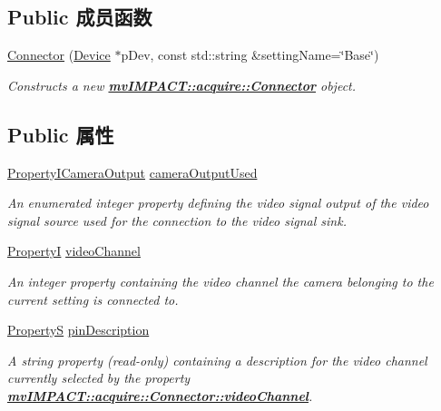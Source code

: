 \subsection*{Public 成员函数}
\begin{DoxyCompactItemize}
\item 
\hyperlink{classmv_i_m_p_a_c_t_1_1acquire_1_1_connector_ae857d0fefd53cf48038b011819e4fb9d}{Connector} (\hyperlink{classmv_i_m_p_a_c_t_1_1acquire_1_1_device}{Device} $\ast$p\+Dev, const std\+::string \&setting\+Name=\char`\"{}Base\char`\"{})
\begin{DoxyCompactList}\small\item\em Constructs a new {\bfseries \hyperlink{classmv_i_m_p_a_c_t_1_1acquire_1_1_connector}{mv\+I\+M\+P\+A\+C\+T\+::acquire\+::\+Connector}} object. \end{DoxyCompactList}\end{DoxyCompactItemize}
\subsection*{Public 属性}
\begin{DoxyCompactItemize}
\item 
\hyperlink{group___common_interface_ga48585b26ebc31ccee54f34c7d6bbdda3}{Property\+I\+Camera\+Output} \hyperlink{classmv_i_m_p_a_c_t_1_1acquire_1_1_connector_aa9f92bb9609d1bfc1d0edd4c23cf7d2d}{camera\+Output\+Used}
\begin{DoxyCompactList}\small\item\em An enumerated integer property defining the video signal output of the video signal source used for the connection to the video signal sink. \end{DoxyCompactList}\item 
\hyperlink{group___common_interface_ga12d5e434238ca242a1ba4c6c3ea45780}{Property\+I} \hyperlink{classmv_i_m_p_a_c_t_1_1acquire_1_1_connector_a22c033da953a263629c4dcf410cfab30}{video\+Channel}
\begin{DoxyCompactList}\small\item\em An integer property containing the video channel the camera belonging to the current setting is connected to. \end{DoxyCompactList}\item 
\hyperlink{classmv_i_m_p_a_c_t_1_1acquire_1_1_property_s}{Property\+S} \hyperlink{classmv_i_m_p_a_c_t_1_1acquire_1_1_connector_a820c1d3a103073ada11d790b7c63b428}{pin\+Description}
\begin{DoxyCompactList}\small\item\em A string property {\bfseries }(read-\/only) containing a description for the video channel currently selected by the property {\bfseries \hyperlink{classmv_i_m_p_a_c_t_1_1acquire_1_1_connector_a22c033da953a263629c4dcf410cfab30}{mv\+I\+M\+P\+A\+C\+T\+::acquire\+::\+Connector\+::video\+Channel}}. \end{DoxyCompactList}\end{DoxyCompactItemize}
